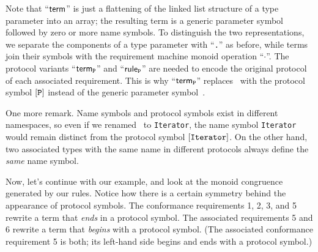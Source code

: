 \documentclass[../generics]{subfiles}
\begin{document}
\begin{example}
Note that ``$\mathsf{term}$'' is just a flattening of the linked list structure of a type parameter into an array; the resulting term is a generic parameter symbol followed by zero or more name symbols. To distinguish the two representations, we separate the components of a type parameter with ``\texttt{.}'' as before, while terms join their symbols with the requirement machine \index{$\cdot$}monoid operation ``\;$\cdot$\;''. The protocol variants ``$\mathsf{term}_{\texttt{P}}$'' and ``$\mathsf{rule}_{\texttt{P}}$'' are needed to encode the original protocol of each associated requirement. This is why ``$\mathsf{term}_{\texttt{P}}$'' replaces \IndexSelf\tSelf\ with the protocol symbol $[\texttt{P}]$ instead of the generic parameter symbol~\rT.

One more remark. Name symbols and protocol symbols exist in different namespaces, so even if we renamed \tIterator\ to \texttt{Iterator}, the name symbol \texttt{Iterator} would remain distinct from the protocol symbol $[\texttt{Iterator}]$. On the other hand, two associated types with the same name in different protocols always define the \emph{same} name symbol.

Now, let's continue with our example, and look at the monoid congruence generated by our rules. Notice how there is a certain symmetry behind the appearance of protocol symbols. The conformance requirements 1, 2, 3, and 5 rewrite a term that \emph{ends} in a protocol symbol. The associated requirements 5 and 6 rewrite a term that \emph{begins} with a protocol symbol. (The associated conformance requirement 5 is both; its left-hand side begins and ends with a protocol symbol.)


\end{example}
\end{document}
